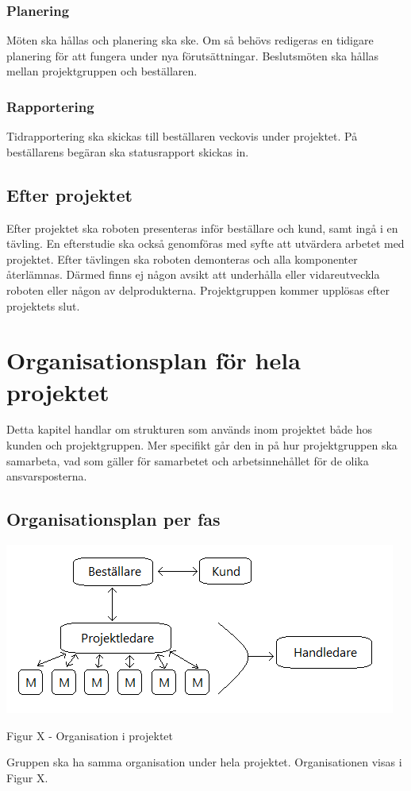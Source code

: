 \documentclass{article}
\begin{document}
\subsubsection{Planering}
Möten ska hållas och planering ska ske. Om så behövs redigeras en tidigare planering för att fungera under nya förutsättningar. Beslutsmöten ska hållas mellan projektgruppen och beställaren.

\subsubsection{Rapportering}
Tidrapportering ska skickas till beställaren veckovis under projektet. På beställarens begäran ska statusrapport skickas in.

\subsection{Efter projektet}
Efter projektet ska roboten presenteras inför beställare och kund, samt ingå i en tävling. En efterstudie ska också genomföras med syfte att utvärdera arbetet med projektet. Efter tävlingen ska roboten demonteras och alla komponenter återlämnas. Därmed finns ej någon avsikt att underhålla eller vidareutveckla roboten eller någon av delprodukterna. Projektgruppen kommer upplösas efter projektets slut.

\section{Organisationsplan för hela projektet}
Detta kapitel handlar om strukturen som används inom projektet både hos kunden och projektgruppen. Mer specifikt går den in på hur projektgruppen ska samarbeta, vad som gäller för samarbetet och arbetsinnehållet för de olika ansvarsposterna.

\subsection{Organisationsplan per fas}
\includegraphics{Organisationsplan}
\caption{Figur X - Organisation i projektet}
Gruppen ska ha samma organisation under hela projektet. Organisationen visas i Figur X.
\end{document}
